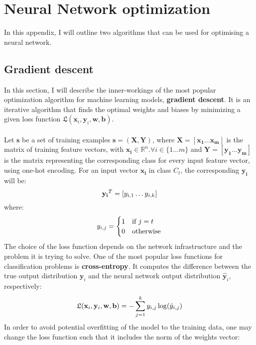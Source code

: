 \chapter{Neural Network optimization} \label{appendix-MLP-opt}
In this appendix, I will outline two algorithms that can be used for optimising a neural network.
\section{Gradient descent}
In this section, I will describe the inner-workings of the most popular optimization algorithm for machine learning models, \textbf{gradient descent}. It is an iterative algorithm that finds the optimal weights and biases by minimizing a given loss function $\mathfrak{L}(\mathbf{x}_i, \mathbf{y}_i, \mathbf{w}, \mathbf{b})$.
\\ \\
Let $\mathbf{s}$ be a set of training examples $\mathbf{s}=(\mathbf{X}, \mathbf{Y})$, where $\mathbf{X} = [\mathbf{x_1}\dots\mathbf{x_m}]$ is the matrix of training feature vectors, with $\mathbf{x_i}\in\mathbb{R}^n. \forall i \in \{1\dots m\}$ and $\mathbf{Y} = [\mathbf{y_1}\dots\mathbf{y_m}]$ is the matrix representing the corresponding class for every input feature vector, using one-hot encoding. For an input vector $\mathbf{x_i}$ in class $C_t$, the corresponding $\mathbf{y_i}$ will be:
\begin{equation}
\centering
\mathbf{y_i}^T = [y_{i, 1}\dots y_{i, k}]
\end{equation} 
where:
\begin{equation}
\centering
y_{i, j} = 
\begin{cases}
1 & \text{if } j = t \\
0 & \text{otherwise}
\end{cases}
\end{equation}
The choice of the loss function depends on the network infrastructure and the problem it is trying to solve. One of the most popular loss functions for classification problems is \textbf{cross-entropy}. It computes the difference between the true output distribution $\mathbf{y}_i$ and the neural network output distribution $\mathbf{\hat{y}}_i$, respectively:
\begin{equation}
\centering
\mathfrak{L}(\mathbf{x}_i, \mathbf{y}_i, \mathbf{w}, \mathbf{b}) = -\sum_{j=1}^{k}y_{i,j}\log(\hat{y}_{i,j})
\end{equation}
In order to avoid potential overfitting of the model to the training data, one may change the loss function such that it includes the norm of the weights vector:
